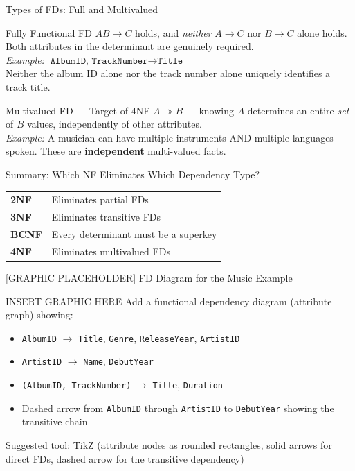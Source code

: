 \begin{frame}{Types of FDs: Full and Multivalued}
  \begin{block}{Fully Functional FD}
    $AB \to C$ holds, and \emph{neither} $A \to C$ nor $B \to C$ alone holds.
    Both attributes in the determinant are genuinely required.\\[2pt]
    \textit{Example:} $\texttt{AlbumID, TrackNumber} \to \texttt{Title}$\\
    Neither the album ID alone nor the track number alone uniquely identifies a
    track title.
  \end{block}

  \begin{block}{Multivalued FD --- Target of 4NF}
    $A \twoheadrightarrow B$ --- knowing $A$ determines an entire \emph{set} of
    $B$ values, independently of other attributes.\\[2pt]
    \textit{Example:} A musician can have multiple instruments AND multiple
    languages spoken.  These are \textbf{independent} multi-valued facts.
  \end{block}

  \begin{alertblock}{Summary: Which NF Eliminates Which Dependency Type?}
    \small
    \begin{tabular}{ll}
      \textbf{2NF}  & Eliminates partial FDs \\
      \textbf{3NF}  & Eliminates transitive FDs \\
      \textbf{BCNF} & Every determinant must be a superkey \\
      \textbf{4NF}  & Eliminates multivalued FDs \\
    \end{tabular}
  \end{alertblock}
\end{frame}

\begin{frame}{[GRAPHIC PLACEHOLDER] FD Diagram for the Music Example}
  \begin{alertblock}{INSERT GRAPHIC HERE}
    Add a functional dependency diagram (attribute graph) showing:
    \begin{itemize}
      \item \texttt{AlbumID} $\to$ \texttt{Title}, \texttt{Genre},
            \texttt{ReleaseYear}, \texttt{ArtistID}
      \item \texttt{ArtistID} $\to$ \texttt{Name}, \texttt{DebutYear}
      \item \texttt{(AlbumID, TrackNumber)} $\to$ \texttt{Title}, \texttt{Duration}
      \item Dashed arrow from \texttt{AlbumID} through \texttt{ArtistID} to
            \texttt{DebutYear} showing the transitive chain
    \end{itemize}
    Suggested tool: TikZ (attribute nodes as rounded rectangles, solid arrows for
    direct FDs, dashed arrow for the transitive dependency)
  \end{alertblock}
\end{frame}

